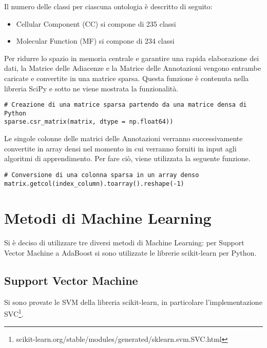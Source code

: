 \documentclass[12pt,a4paper,oneside,hidelinks]{report}
\begin{document}
Il numero delle classi per ciascuna ontologia è descritto di seguito:

\begin{itemize}
    \item Cellular Component (CC) si compone di 235 classi
    \item Molecular Function (MF) si compone di 234 classi
\end{itemize}
  
Per ridurre lo spazio in memoria centrale e garantire una rapida elaborazione dei dati, la Matrice delle Adiacenze e la Matrice delle Annotazioni vengono entrambe caricate e convertite in una matrice sparsa. Questa funzione è contenuta nella libreria SciPy e sotto ne viene mostrata la funzionalità.

\newpage

\lstset{style=customp}

\begin{lstlisting} 
# Creazione di una matrice sparsa partendo da una matrice densa di Python
sparse.csr_matrix(matrix, dtype = np.float64))
\end{lstlisting}

Le singole colonne delle matrici delle Annotazioni verranno successivamente convertite in array densi nel momento in cui verranno forniti in input agli algoritmi di apprendimento. Per fare ciò, viene utilizzata la seguente funzione.

\lstset{style=customp}

\begin{lstlisting} 
# Conversione di una colonna sparsa in un array denso
matrix.getcol(index_column).toarray().reshape(-1)
\end{lstlisting}

\chapter{Metodi di Machine Learning} 
\label{chap:metodi}

Si è deciso di utilizzare tre diversi metodi di Machine Learning: per Support Vector Machine a AdaBoost si sono utilizzate le librerie scikit-learn per Python.

\section{Support Vector Machine}
Si sono provate le SVM della libreria scikit-learn, in particolare l'implementazione SVC\footnote{scikit-learn.org/stable/modules/generated/sklearn.svm.SVC.html}.
\end{document}
